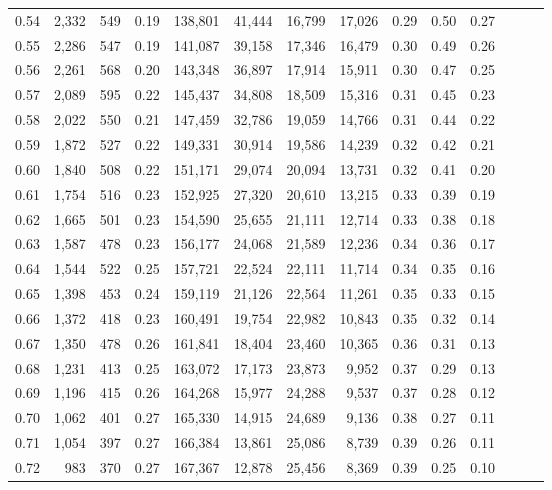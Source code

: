 \begin{tabular}{rrrrrrrrrrrrrr}
0.54 &  2,332 &  549 &  0.19 &  138,801 &   41,444 &  16,799 &  17,026 &  0.29 &  0.50 &      0.27 \\
0.55 &  2,286 &  547 &  0.19 &  141,087 &   39,158 &  17,346 &  16,479 &  0.30 &  0.49 &      0.26 \\
0.56 &  2,261 &  568 &  0.20 &  143,348 &   36,897 &  17,914 &  15,911 &  0.30 &  0.47 &      0.25 \\
0.57 &  2,089 &  595 &  0.22 &  145,437 &   34,808 &  18,509 &  15,316 &  0.31 &  0.45 &      0.23 \\
0.58 &  2,022 &  550 &  0.21 &  147,459 &   32,786 &  19,059 &  14,766 &  0.31 &  0.44 &      0.22 \\
0.59 &  1,872 &  527 &  0.22 &  149,331 &   30,914 &  19,586 &  14,239 &  0.32 &  0.42 &      0.21 \\
0.60 &  1,840 &  508 &  0.22 &  151,171 &   29,074 &  20,094 &  13,731 &  0.32 &  0.41 &      0.20 \\
0.61 &  1,754 &  516 &  0.23 &  152,925 &   27,320 &  20,610 &  13,215 &  0.33 &  0.39 &      0.19 \\
0.62 &  1,665 &  501 &  0.23 &  154,590 &   25,655 &  21,111 &  12,714 &  0.33 &  0.38 &      0.18 \\
0.63 &  1,587 &  478 &  0.23 &  156,177 &   24,068 &  21,589 &  12,236 &  0.34 &  0.36 &      0.17 \\
0.64 &  1,544 &  522 &  0.25 &  157,721 &   22,524 &  22,111 &  11,714 &  0.34 &  0.35 &      0.16 \\
0.65 &  1,398 &  453 &  0.24 &  159,119 &   21,126 &  22,564 &  11,261 &  0.35 &  0.33 &      0.15 \\
0.66 &  1,372 &  418 &  0.23 &  160,491 &   19,754 &  22,982 &  10,843 &  0.35 &  0.32 &      0.14 \\
0.67 &  1,350 &  478 &  0.26 &  161,841 &   18,404 &  23,460 &  10,365 &  0.36 &  0.31 &      0.13 \\
0.68 &  1,231 &  413 &  0.25 &  163,072 &   17,173 &  23,873 &   9,952 &  0.37 &  0.29 &      0.13 \\
0.69 &  1,196 &  415 &  0.26 &  164,268 &   15,977 &  24,288 &   9,537 &  0.37 &  0.28 &      0.12 \\
0.70 &  1,062 &  401 &  0.27 &  165,330 &   14,915 &  24,689 &   9,136 &  0.38 &  0.27 &      0.11 \\
0.71 &  1,054 &  397 &  0.27 &  166,384 &   13,861 &  25,086 &   8,739 &  0.39 &  0.26 &      0.11 \\
0.72 &    983 &  370 &  0.27 &  167,367 &   12,878 &  25,456 &   8,369 &  0.39 &  0.25 &      0.10 \\

\end{tabular}
